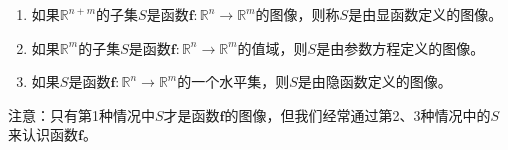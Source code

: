 \documentclass[main.tex]{subfiles}
\begin{document}
\begin{enumerate}
    \item 如果$\mathbb{R}^{n+m}$的子集$S$是函数$\mathbf{f}:\mathbb{R}^n\rightarrow\mathbb{R}^m$的图像，则称$S$是由显函数定义的图像。
    \item 如果$\mathbb{R}^{m}$的子集$S$是函数$\mathbf{f}:\mathbb{R}^n\rightarrow\mathbb{R}^m$的值域，则$S$是由参数方程定义的图像。
    \item 如果$S$是函数$\mathbf{f}:\mathbb{R}^n\rightarrow\mathbb{R}^m$的一个水平集，则$S$是由隐函数定义的图像。
\end{enumerate}

注意：只有第1种情况中$S$才是函数$\mathbf{f}$的图像，但我们经常通过第2、3种情况中的$S$来认识函数$\mathbf{f}$。
\end{document}

